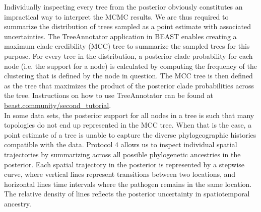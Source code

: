 \documentclass{article}
\begin{document}
Individually inspecting every tree from the posterior obviously constitutes an impractical way to interpret the MCMC results. We are thus required to summarize the distribution of trees sampled as a point estimate with associated uncertainties. The TreeAnnotator application in BEAST enables creating a maximum clade credibility (MCC) tree to summarize the sampled trees for this purpose. For every tree in the distribution, a posterior clade probability for each node (i.e. the support for a node) is calculated by computing the frequency of the clustering that is defined by the node in question. The MCC tree is then defined as the tree that maximizes the product of the posterior clade probabilities across the tree. Instructions on how to use TreeAnnotator can be found at \url{beast.community/second_tutorial}. \\

In some data sets, the posterior support for all nodes in a tree is such that many topologies do not end up represented in the MCC tree.
When that is the case, a point estimate of a tree is unable to capture the diverse phylogeographic histories compatible with the data. Protocol 4 allows us to inspect individual spatial trajectories by summarizing across all possible phylogenetic ancestries in the posterior. Each spatial trajectory in the posterior is represented by a stepwise curve, where vertical lines represent transitions between two locations, and horizontal lines time intervals where the pathogen remains in the same location. The relative density of lines reflects the posterior uncertainty in spatiotemporal ancestry. %
\end{document}
